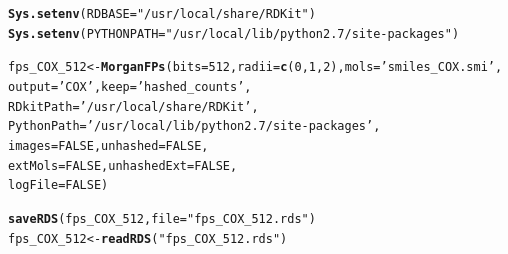 \documentclass[twoside,a4wide,12pt]{article}\usepackage[]{graphicx}\usepackage[]{color}
\makeatletter
\newcommand{\hlnum}[1]{\textcolor[rgb]{0.686,0.059,0.569}{#1}}%
\newcommand{\hlstr}[1]{\textcolor[rgb]{0.192,0.494,0.8}{#1}}%
\newcommand{\hlstd}[1]{\textcolor[rgb]{0.345,0.345,0.345}{#1}}%
\newcommand{\hlkwb}[1]{\textcolor[rgb]{0.69,0.353,0.396}{#1}}%
\newcommand{\hlkwc}[1]{\textcolor[rgb]{0.333,0.667,0.333}{#1}}%
\newcommand{\hlkwd}[1]{\textcolor[rgb]{0.737,0.353,0.396}{\textbf{#1}}}%
\newenvironment{kframe}{%
 \def\at@end@of@kframe{}%
 \ifinner\ifhmode%
  \def\at@end@of@kframe{\end{minipage}}%
  \begin{minipage}{\columnwidth}%
 \fi\fi%
 \def\FrameCommand##1{\hskip\@totalleftmargin \hskip-\fboxsep
 \colorbox{shadecolor}{##1}\hskip-\fboxsep
     \hskip-\linewidth \hskip-\@totalleftmargin \hskip\columnwidth}%
 \MakeFramed {\advance\hsize-\width
   \@totalleftmargin\z@ \linewidth\hsize
   \@setminipage}}%
 {\par\unskip\endMakeFramed%
 \at@end@of@kframe}
\newenvironment{knitrout}{}{} %
\makeatother
\begin{document}
\begin{knitrout}
\color{fgcolor}\begin{kframe}
\begin{alltt}
\hlkwd{Sys.setenv}\hlstd{(}\hlkwc{RDBASE}\hlstd{=}\hlstr{"/usr/local/share/RDKit"}\hlstd{)}
\hlkwd{Sys.setenv}\hlstd{(}\hlkwc{PYTHONPATH}\hlstd{=}\hlstr{"/usr/local/lib/python2.7/site-packages"}\hlstd{)}

\hlstd{fps_COX_512} \hlkwb{<-} \hlkwd{MorganFPs}\hlstd{(}\hlkwc{bits}\hlstd{=}\hlnum{512}\hlstd{,}\hlkwc{radii}\hlstd{=}\hlkwd{c}\hlstd{(}\hlnum{0}\hlstd{,}\hlnum{1}\hlstd{,}\hlnum{2}\hlstd{),}\hlkwc{mols}\hlstd{=}\hlstr{'smiles_COX.smi'}\hlstd{,}
                         \hlkwc{output}\hlstd{=}\hlstr{'COX'}\hlstd{,}\hlkwc{keep}\hlstd{=}\hlstr{'hashed_counts'}\hlstd{,}
                         \hlkwc{RDkitPath}\hlstd{=}\hlstr{'/usr/local/share/RDKit'}\hlstd{,}
                         \hlkwc{PythonPath}\hlstd{=}\hlstr{'/usr/local/lib/python2.7/site-packages'}\hlstd{,}
                         \hlkwc{images} \hlstd{=} \hlnum{FALSE}\hlstd{,} \hlkwc{unhashed} \hlstd{=} \hlnum{FALSE}\hlstd{,}
                         \hlkwc{extMols} \hlstd{=} \hlnum{FALSE}\hlstd{,} \hlkwc{unhashedExt} \hlstd{=} \hlnum{FALSE}\hlstd{,}
                         \hlkwc{logFile} \hlstd{=} \hlnum{FALSE}\hlstd{)}

\hlkwd{saveRDS}\hlstd{(fps_COX_512,}\hlkwc{file}\hlstd{=}\hlstr{"fps_COX_512.rds"}\hlstd{)}
\hlstd{fps_COX_512} \hlkwb{<-} \hlkwd{readRDS}\hlstd{(}\hlstr{"fps_COX_512.rds"}\hlstd{)}
\end{alltt}
\end{kframe}
\end{knitrout}
\end{document}
